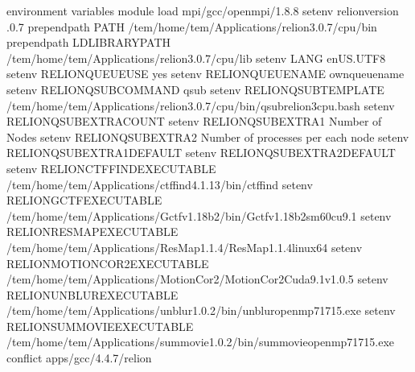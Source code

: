 \documentclass[letterpaper,10pt,english]{sphinxmanual}
\begin{document}
\begin{sphinxVerbatim}[commandchars=\\\{\}]
 environment variables
module           load mpi/gcc/openmpi/1.8.8
setenv           relion\PYGZus{}version .0.7
prepend\PYGZhy{}path     PATH /tem/home/tem/\PYGZus{}Applications/relion\PYGZhy{}3.0.7/cpu/bin
prepend\PYGZhy{}path     LD\PYGZus{}LIBRARY\PYGZus{}PATH /tem/home/tem/\PYGZus{}Applications/relion\PYGZhy{}3.0.7/cpu/lib
setenv           LANG en\PYGZus{}US.UTF\PYGZhy{}8
setenv           RELION\PYGZus{}QUEUE\PYGZus{}USE yes
setenv           RELION\PYGZus{}QUEUE\PYGZus{}NAME own\PYGZus{}queue\PYGZus{}name
setenv           RELION\PYGZus{}QSUB\PYGZus{}COMMAND qsub
setenv           RELION\PYGZus{}QSUB\PYGZus{}TEMPLATE /tem/home/tem/\PYGZus{}Applications/relion\PYGZhy{}3.0.7/cpu/bin/qsub\PYGZhy{}relion3\PYGZhy{}cpu.bash
setenv           RELION\PYGZus{}QSUB\PYGZus{}EXTRA\PYGZus{}COUNT 
setenv           RELION\PYGZus{}QSUB\PYGZus{}EXTRA1 Number of Nodes
setenv           RELION\PYGZus{}QSUB\PYGZus{}EXTRA2 Number of processes per each node
setenv           RELION\PYGZus{}QSUB\PYGZus{}EXTRA1\PYGZus{}DEFAULT 
setenv           RELION\PYGZus{}QSUB\PYGZus{}EXTRA2\PYGZus{}DEFAULT 
setenv           RELION\PYGZus{}CTFFIND\PYGZus{}EXECUTABLE /tem/home/tem/\PYGZus{}Applications/ctffind\PYGZhy{}4.1.13/bin/ctffind
setenv           RELION\PYGZus{}GCTF\PYGZus{}EXECUTABLE /tem/home/tem/\PYGZus{}Applications/Gctf\PYGZus{}v1.18\PYGZus{}b2/bin/Gctf\PYGZus{}v1.18\PYGZus{}b2\PYGZus{}sm60\PYGZus{}cu9.1
setenv           RELION\PYGZus{}RESMAP\PYGZus{}EXECUTABLE /tem/home/tem/\PYGZus{}Applications/ResMap\PYGZhy{}1.1.4/ResMap\PYGZhy{}1.1.4\PYGZhy{}linux64
setenv           RELION\PYGZus{}MOTIONCOR2\PYGZus{}EXECUTABLE /tem/home/tem/\PYGZus{}Applications/MotionCor2/MotionCor2\PYGZus{}Cuda9.1\PYGZus{}v1.0.5
setenv           RELION\PYGZus{}UNBLUR\PYGZus{}EXECUTABLE /tem/home/tem/\PYGZus{}Applications/unblur\PYGZus{}1.0.2/bin/unblur\PYGZus{}openmp\PYGZus{}7\PYGZus{}17\PYGZus{}15.exe
setenv           RELION\PYGZus{}SUMMOVIE\PYGZus{}EXECUTABLE /tem/home/tem/\PYGZus{}Applications/summovie\PYGZus{}1.0.2/bin/sum\PYGZus{}movie\PYGZus{}openmp\PYGZus{}7\PYGZus{}17\PYGZus{}15.exe
conflict         apps/gcc/4.4.7/relion
\PYGZhy{}\PYGZhy{}\PYGZhy{}\PYGZhy{}\PYGZhy{}\PYGZhy{}\PYGZhy{}\PYGZhy{}\PYGZhy{}\PYGZhy{}\PYGZhy{}\PYGZhy{}\PYGZhy{}\PYGZhy{}\PYGZhy{}\PYGZhy{}\PYGZhy{}\PYGZhy{}\PYGZhy{}\PYGZhy{}\PYGZhy{}\PYGZhy{}\PYGZhy{}\PYGZhy{}\PYGZhy{}\PYGZhy{}\PYGZhy{}\PYGZhy{}\PYGZhy{}\PYGZhy{}\PYGZhy{}\PYGZhy{}\PYGZhy{}\PYGZhy{}\PYGZhy{}\PYGZhy{}\PYGZhy{}\PYGZhy{}\PYGZhy{}\PYGZhy{}\PYGZhy{}\PYGZhy{}\PYGZhy{}\PYGZhy{}\PYGZhy{}\PYGZhy{}\PYGZhy{}\PYGZhy{}\PYGZhy{}\PYGZhy{}\PYGZhy{}\PYGZhy{}\PYGZhy{}\PYGZhy{}\PYGZhy{}\PYGZhy{}\PYGZhy{}\PYGZhy{}\PYGZhy{}\PYGZhy{}\PYGZhy{}\PYGZhy{}\PYGZhy{}\PYGZhy{}\PYGZhy{}\PYGZhy{}\PYGZhy{}
\end{sphinxVerbatim}
\end{document}
